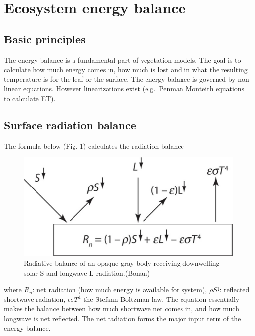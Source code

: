 \documentclass[
  12pt,
  oneside]{book}
\begin{document}
\hypertarget{ecosystem-energy-balance}{%
\section{Ecosystem energy balance}\label{ecosystem-energy-balance}}

\hypertarget{basic-principles}{%
\subsection{Basic principles}\label{basic-principles}}

The energy balance is a fundamental part of vegetation models. The goal is to calculate how much energy comes in, how much is lost and in what the resulting temperature is for the leaf or the surface. The energy balance is governed by non-linear equations. However linearizations exist (e.g.~Penman Monteith equations to calculate ET).

\hypertarget{surface-radiation-balance}{%
\subsection{Surface radiation balance}\label{surface-radiation-balance}}

The formula below (Fig. \ref{fig:f329}) calculates the radiation balance

\begin{figure}

{\centering \includegraphics[width=0.8\linewidth]{figures/chap3/f329_rad_balance} 

}

\caption{Radiative balance of an opaque gray body receiving downwelling solar S and longwave L radiation.(Bonan)}\label{fig:f329}
\end{figure}

where \(R_n\): net radiation (how much energy is available for system), \(\rho S^{\downarrow}\): reflected shortwave radiation, \(\epsilon \sigma T^{4}\) the Stefann-Boltzman law. The equation essentially makes the balance between how much shortwave net comes in, and how much longwave is net reflected. The net radiation forms the major input term of the energy balance.
\end{document}
